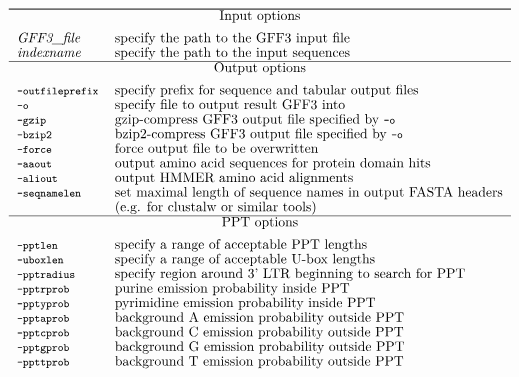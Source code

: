 \documentclass[12pt,titlepage]{article}
\newcommand{\LTRdigest}{\textit{LTRdigest}\xspace}
\begin{document}
\begin{table}[htbp]
\caption{Overview of the \LTRdigest options sorted by categories.}
\begin{footnotesize}
\[
\renewcommand{\arraystretch}{0.89}
\begin{tabular}{ll}\hline
\Showoptiongroup{Input options}
\emph{GFF3\_file}& specify the path to the GFF3 input file
\\
\emph{indexname}& specify the path to the input sequences
\\

\Showoptiongroup{Output options}
\Showoption{outfileprefix}& specify prefix for sequence and tabular output files
\\
\Showoption{o}& specify file to output result GFF3 into
\\
\Showoption{gzip}& gzip-compress GFF3 output file specified by \Showoption{o}
\\
\Showoption{bzip2}& bzip2-compress GFF3 output file specified by \Showoption{o}
\\
\Showoption{force}& force output file to be overwritten
\\
\Showoption{aaout}& output amino acid sequences for protein domain hits
\\
\Showoption{aliout}& output HMMER amino acid alignments
\\
\Showoption{seqnamelen}& set maximal length of sequence names in output FASTA headers\\
                       & (e.g. for clustalw or similar tools)
\\
\Showoptiongroup{PPT options}
\Showoption{pptlen}& specify a range of acceptable PPT lengths
\\
\Showoption{uboxlen}& specify a range of acceptable U-box lengths
\\
\Showoption{pptradius}& specify region around 3' LTR beginning to search for PPT
\\
\Showoption{pptrprob}& purine emission probability inside PPT
\\
\Showoption{pptyprob}& pyrimidine emission probability inside PPT
\\
\Showoption{pptaprob}& background A emission probability outside PPT
\\
\Showoption{pptcprob}& background C emission probability outside PPT
\\
\Showoption{pptgprob}& background G emission probability outside PPT
\\
\Showoption{ppttprob}& background T emission probability outside PPT

\end{tabular}\]
\end{footnotesize}
\end{table}
\end{document}
